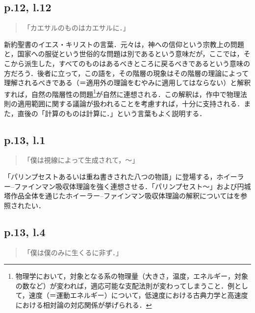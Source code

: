 \documentclass[10pt, a5paper, twoside]{jsarticle}
\theoremstyle{definition}
\begin{document}
            \subsection{p.12, l.12}

                \begin{quote}

                    「カエサルのものはカエサルに．」

                \end{quote}

                新約聖書のイエス・キリストの言葉．元々は，神への信仰という宗教上の問題と，国家への服従という世俗的な問題は別であるという意味だが，ここでは，そこから派生した，すべてのものはあるべきところに戻るべきであるという意味の方だろう．後者に立って，この語を，その階層の現象はその階層の理論によって理解されるべきである（＝適用外の理論をむやみに適用してはならない）と解釈すれば，自然の階層性の問題\footnote{物理学において，対象となる系の物理量（大きさ，温度，エネルギー，対象の数など）が変われば，適応可能な支配法則が変わってしまうこと．例として，速度（＝運動エネルギー）について，低速度における古典力学と高速度における相対論の対応関係が挙げられる．}が自然に連想される．この解釈は，作中で物理法則の適用範囲に関する議論が扱われることを考慮すれば，十分に支持される．また，直後の「計算のものは計算に．」という言葉もよく説明する．

            \subsection{p.13, l.1}

                \begin{quote}

                    「僕は視線によって生成されて，〜」

                \end{quote}

                「パリンプセストあるいは重ね書きされた八つの物語」に登場する，ホイーラー--ファインマン吸収体理論を強く連想させる．「パリンプセスト〜」および円城塔作品全体を通じたホイーラー--ファインマン吸収体理論の解釈については\cite{pa}を参照されたい．

            \subsection{p.13, l.4}

                \begin{quote}

                    「僕は僕のみに生くるに非ず．」

                \end{quote}
\end{document}
